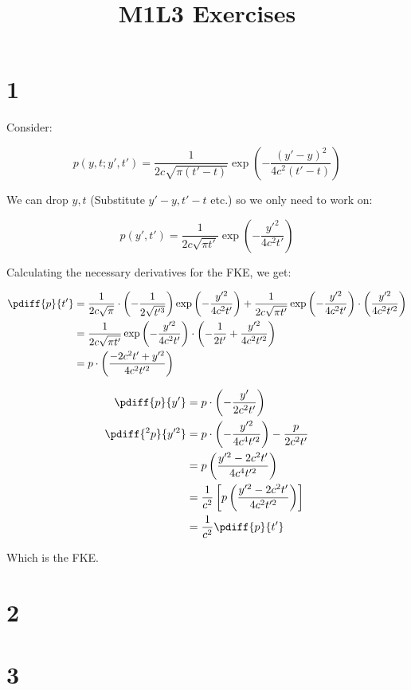 \documentclass{article}
\begin{document}
	\title{M1L3 Exercises}
	\section*{1}
	Consider:
	
	\begin{equation*}
		p(y,t;y',t') = \frac{1}{2c\sqrt{\pi(t'-t)}}\exp\left(-\frac{(y'-y)^2}{4c^2(t'-t)}\right)
	\end{equation*}
	
	We can drop $y,t$ (Substitute $y'-y,t'-t$ etc.) so we only need to work on:
	
	\begin{equation*}
		p(y',t') = \frac{1}{2c\sqrt{\pi t'}}\exp\left(-\frac{y'^2}{4c^2 t'}\right)
	\end{equation*}
	
	Calculating the necessary derivatives for the FKE, we get:
	
	\begin{align*}
		\pdiff{p}{t'} &= \frac{1}{2c\sqrt{\pi}} \cdot \left(-\frac{1}{2\sqrt{t'^3}}\right)\exp\left(-\frac{y'^2}{4c^2 t'}\right) + \frac{1}{2c\sqrt{\pi t'}}\exp\left(-\frac{y'^2}{4c^2 t'}\right) \cdot \left(\frac{y'^2}{4c^2t'^2}\right) \\
		&= \frac{1}{2c\sqrt{\pi t'}}\exp\left(-\frac{y'^2}{4c^2 t'}\right) \cdot \left(-\frac{1}{2t'} + \frac{y'^2}{4c^2t'^2}\right) \\
		&= p \cdot \left(\frac{-2c^2t'+y'^2}{4c^2t'^2}\right)
	\end{align*}
	
	\begin{align*}
		\pdiff{p}{y'} &= p \cdot \left(-\frac{y'}{2c^2t'}\right) \\
		\pdiff{^2p}{y'^2} &= p \cdot \left(-\frac{y'^2}{4c^4t'^2}\right) - \frac{p}{2c^2t'} \\
		&= p \left(\frac{y'^2-2c^2t'}{4c^4t'^2}\right) \\
		&= \frac{1}{c^2} 
		\left[p \left( \frac{y'^2-2c^2t'}{4c^2t'^2} \right)\right] \\
		&= \frac{1}{c^2} \pdiff{p}{t'}
	\end{align*}
	
	Which is the FKE.
	\section*{2}
	\section*{3}
\end{document}
